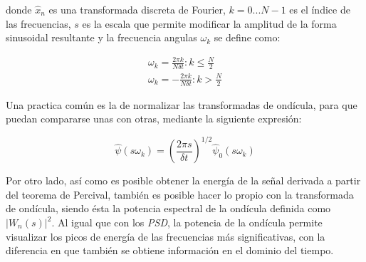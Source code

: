 donde $\hat{x}_n$ es una transformada discreta de Fourier, $k=0...N-1$ es el índice de las frecuencias, $s$ es la escala que permite modificar la amplitud de la forma sinusoidal resultante y la frecuencia angulas $\omega_k$ se define como:

\begin{equation}
    \begin{split}
        \omega_k = \frac{2 \pi k}{N {\displaystyle \delta} t} : k \le \frac{N}{2}\\
        \omega_k = - \frac{2 \pi k}{N {\displaystyle \delta} t} : k > \frac{N}{2}
    \end{split}
\end{equation}

Una practica común \parencite{book_analysis_Method_multiSp_data, guide_wavelet_routines} es la de normalizar las transformadas de ondícula, para que puedan compararse unas con otras, mediante la siguiente expresión:

\begin{equation}
    \hat{\psi}(s \omega_k) = (\frac{2 \pi s}{{\displaystyle \delta} t} )^{1/2} \hat{\psi}_0 (s \omega_k)
\end{equation}

Por otro lado, así como es posible obtener la energía de la señal derivada a partir del teorema de Percival, también es posible hacer lo propio con la transformada de ondícula, siendo ésta la potencia espectral de la ondícula definida como $|W_n(s)|^2$. Al igual que con los \emph{PSD}, la potencia de la ondícula permite visualizar los picos de energía de las frecuencias más significativas, con la diferencia en que también se obtiene información en el dominio del tiempo.
